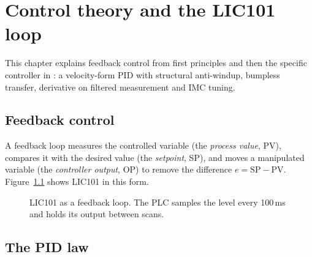 \chapter{Control theory and the LIC101 loop}
\label{ch:control}

This chapter explains feedback control from first principles and then the
specific controller in : a velocity-form PID with
structural anti-windup, bumpless transfer, derivative on filtered measurement
and IMC tuning.

\section{Feedback control}

A feedback loop measures the controlled variable (the \emph{process value},
PV), compares it with the desired value (the \emph{setpoint}, SP), and moves
a manipulated variable (the \emph{controller output}, OP) to remove the
difference $e = \text{SP} - \text{PV}$. Figure~\ref{fig:loop} shows LIC101 in
this form.

\begin{figure}[htbp]
\centering
{}
\caption{LIC101 as a feedback loop. The PLC samples the level every 100\,ms and
holds its output between scans.}
\label{fig:loop}
\end{figure}

\section{The PID law}

